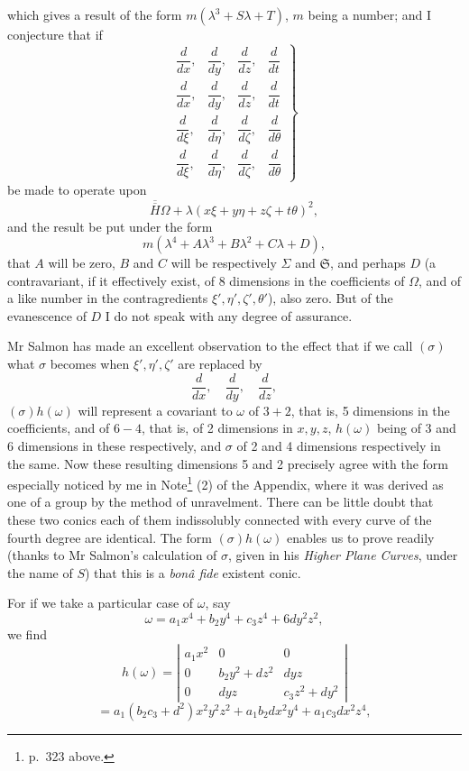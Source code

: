 \documentclass[11pt]{article}
\newcommand{\sourcepage}[1]{\marginpar{\scriptsize p.~#1}}
\begin{document}
\sourcepage{332}
which gives a result of the form $m(\lambda^3+S\lambda+T)$, $m$ being a number; and I conjecture that if
\[
\left.
\begin{matrix}
\dfrac{d}{dx},&\dfrac{d}{dy},&\dfrac{d}{dz},&\dfrac{d}{dt}\\
\dfrac{d}{dx},&\dfrac{d}{dy},&\dfrac{d}{dz},&\dfrac{d}{dt}\\
\dfrac{d}{d\xi},&\dfrac{d}{d\eta},&\dfrac{d}{d\zeta},&\dfrac{d}{d\theta}\\
\dfrac{d}{d\xi},&\dfrac{d}{d\eta},&\dfrac{d}{d\zeta},&\dfrac{d}{d\theta}
\end{matrix}
\right\}
\]
be made to operate upon
\[
\overline{\overline H}\Omega+\lambda(x\xi+y\eta+z\zeta+t\theta)^2,
\]
and the result be put under the form
\[
m(\lambda^4+A\lambda^3+B\lambda^2+C\lambda+D),
\]
that $A$ will be zero, $B$ and $C$ will be respectively $\Sigma$ and $\mathfrak{S}$, and perhaps $D$ (a contravariant, if it effectively exist, of 8 dimensions in the coefficients of $\Omega$, and of a like number in the contragredients $\xi',\eta',\zeta',\theta'$), also zero. But of the evanescence of $D$ I do not speak with any degree of assurance.

Mr Salmon has made an excellent observation to the effect that if we call $(\sigma)$ what $\sigma$ becomes when $\xi',\eta',\zeta'$ are replaced by
\[
\frac{d}{dx},\quad \frac{d}{dy},\quad \frac{d}{dz},
\]
$(\sigma)h(\omega)$ will represent a covariant to $\omega$ of $3+2$, that is, 5 dimensions in the coefficients, and of $6-4$, that is, of 2 dimensions in $x,y,z$, $h(\omega)$ being of 3 and 6 dimensions in these respectively, and $\sigma$ of 2 and 4 dimensions respectively in the same. Now these resulting dimensions 5 and 2 precisely agree with the form especially noticed by me in Note\footnote{p.~323 above.} (2) of the Appendix, where it was derived as one of a group by the method of unravelment. There can be little doubt that these two conics each of them indissolubly connected with every curve of the fourth degree are identical. The form $(\sigma)h(\omega)$ enables us to prove readily (thanks to Mr Salmon's calculation of $\sigma$, given in his \emph{Higher Plane Curves}, under the name of $S$) that this is a \emph{bonâ fide} existent conic.

For if we take a particular case of $\omega$, say
\[
\omega=a_1x^4+b_2y^4+c_3z^4+6dy^2z^2,
\]
we find
\[
h(\omega)=
\left|\begin{array}{ccc}
a_1x^2&0&0\\
0&b_2y^2+dz^2&dyz\\
0&dyz&c_3z^2+dy^2
\end{array}\right|
\]
\[
=a_1(b_2c_3+d^2)x^2y^2z^2+a_1b_2dx^2y^4+a_1c_3dx^2z^4,
\]
\end{document}
